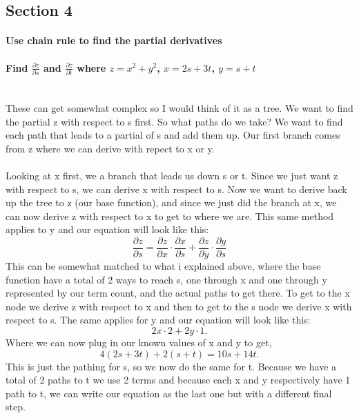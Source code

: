 \documentclass{report}
\begin{document}
\begin{multicols}{2}
\subsection{Section 4}%
\label{sub: Section 4 }
\paragraph{Use chain rule to find the partial derivatives \\ }
\paragraph{Find $ \frac{ \partial z}{\partial s}  $ and $ \frac{ \partial z}{\partial t}  $ where $ z=x^2+y^2 $, $ x=2s+3t $, $ y=s+t $ \\ \\}
These can get somewhat complex so I would think of it as a tree. We want to find the partial z with respect to s first. So what paths do we take? We want to find each path that leads to a partial of s and add them up. Our first branch comes from z where we can derive with repect to x or y. \\ \\ Looking at x first, we a branch that leads us down s or t. Since we just want z with respect to s, we can derive x with respect to s. Now we want to derive back up the tree to z (our base function), and since we just did the branch at x, we can now derive z with respect to x to get to where we are. This same method applies to y and our equation will look like this:
\begin{equation}
\frac{ \partial z}{\partial s} = \frac{ \partial z}{\partial x} \cdot \frac{ \partial x}{\partial s} + \frac{ \partial z}{\partial y} \cdot \frac{ \partial y}{\partial s} 
\end{equation}
This can be somewhat matched to what i explained above, where the base function have a total of 2 ways to reach s, one through x and one through y represented by our term count, and the actual paths to get there. To get to the x node we derive z with respect to x and then to get to the s node we derive x with respect to s. The same applies for y and our equation will look like this:
\[
2x\cdot 2 + 2y \cdot 1
.\] 
Where we can now plug in our known values of x and y to get,
\[
4\left( 2s+3t \right) +2\left( s+t \right) = 10s+14t
.\] 
This is just the pathing for s, so we now do the same for t. Because we have a total of 2 paths to t we use 2 terms and because each x and y respectively have 1 path to t, we can write our equation as the last one but with a different final step. 

\end{multicols}
\end{document}
